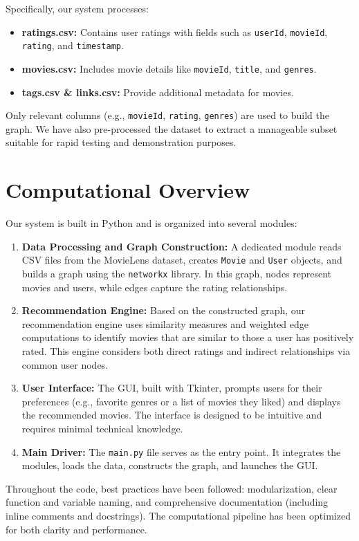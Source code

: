 \documentclass[12pt]{article}
\begin{document}
Specifically, our system processes:
\begin{itemize}
    \item \textbf{ratings.csv:} Contains user ratings with fields such as \texttt{userId}, \texttt{movieId}, \texttt{rating}, and \texttt{timestamp}.
    \item \textbf{movies.csv:} Includes movie details like \texttt{movieId}, \texttt{title}, and \texttt{genres}.
    \item \textbf{tags.csv \& links.csv:} Provide additional metadata for movies.
\end{itemize}

Only relevant columns (e.g., \texttt{movieId}, \texttt{rating}, \texttt{genres}) are used to build the graph. We have also pre-processed the dataset to extract a manageable subset suitable for rapid testing and demonstration purposes.

\section{Computational Overview}
Our system is built in Python and is organized into several modules:
\begin{enumerate}
    \item \textbf{Data Processing and Graph Construction:} A dedicated module reads CSV files from the MovieLens dataset, creates \texttt{Movie} and \texttt{User} objects, and builds a graph using the \texttt{networkx} library. In this graph, nodes represent movies and users, while edges capture the rating relationships.
    \item \textbf{Recommendation Engine:} Based on the constructed graph, our recommendation engine uses similarity measures and weighted edge computations to identify movies that are similar to those a user has positively rated. This engine considers both direct ratings and indirect relationships via common user nodes.
    \item \textbf{User Interface:} The GUI, built with Tkinter, prompts users for their preferences (e.g., favorite genres or a list of movies they liked) and displays the recommended movies. The interface is designed to be intuitive and requires minimal technical knowledge.
    \item \textbf{Main Driver:} The \texttt{main.py} file serves as the entry point. It integrates the modules, loads the data, constructs the graph, and launches the GUI.
\end{enumerate}

Throughout the code, best practices have been followed: modularization, clear function and variable naming, and comprehensive documentation (including inline comments and docstrings). The computational pipeline has been optimized for both clarity and performance.
\end{document}
